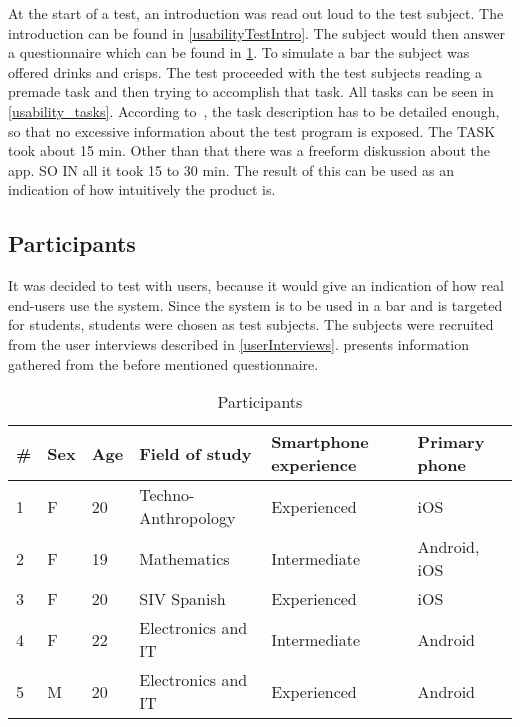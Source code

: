At the start of a test, an introduction was read out loud to the test
subject. The introduction can be found in
\cref{usabilityTestIntro}. The subject would then answer a
questionnaire which can be found in \cref{tab:participants}. To
simulate a bar the subject was offered drinks and crisps. The test
proceeded with the test subjects reading a premade task and then
trying to accomplish that task. All tasks can be seen in \cref{usability_tasks}. According to~\cite{RubinChisnellSpool08}, the task description has to be detailed enough, so that no excessive information about the test program is exposed. The TASK took about 15 min. Other than that there was a freeform diskussion about the app. SO IN all it took 15 to 30 min. The result of this can be used as an indication of how intuitively the product is.

\subsection{Participants}
It was decided to test with users, because it would give an indication
of how real end-users use the system. Since the system is to be used
in a bar and is targeted for students, students were chosen as test
subjects. The subjects were recruited from the user interviews
described in \cref{userInterviews}.  presents
information gathered from the before mentioned questionnaire.

\begin{table}[h]
\begin{tabular}{|l|l|l|l|l|l|}
\hline
\textbf{\#} & \textbf{Sex} & \textbf{Age} & \textbf{Field of study} & \textbf{Smartphone experience} & \textbf{Primary phone} \\ \hline
1                   & F               & 20           & Techno-Anthropology       & Experienced                    & iOS                    \\ \hline
2                   & F               & 19           & Mathematics             & Intermediate                   & Android, iOS           \\ \hline
3                   & F               & 20           & SIV Spanish             & Experienced                    & iOS                    \\ \hline
4                   & F               & 22           & Electronics and IT      & Intermediate                   & Android                \\ \hline
5                   & M               & 20           & Electronics and IT      & Experienced                    & Android                \\ \hline
\end{tabular}
\caption{Participants}\label{tab:participants}
\end{table}

